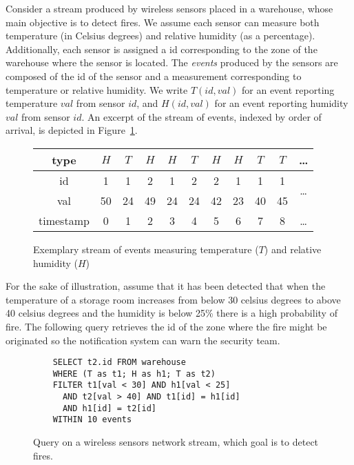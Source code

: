 \begin{example}\label{example:1}
Consider a stream produced by wireless sensors placed in a warehouse, whose main objective is to detect fires. We assume each sensor can measure both temperature (in Celsius degrees) and relative humidity (as a percentage). Additionally, each sensor is assigned a id corresponding to the zone of the warehouse where the sensor is located. The \emph{events} produced by the sensors are composed of the id of the sensor and a measurement corresponding to temperature or relative humidity. We write $T(id, val)$ for an event reporting temperature $val$ from sensor $id$, and $H(id, val)$ for an event reporting humidity $val$ from sensor $id$. An excerpt of the stream of events, indexed by order of arrival, is depicted in Figure~\ref{fig:stream}.

\begin{figure}[H]
  \centering
  \begin{tabular}{|c|c|c|c|c|c|c|c|c|c|c}\hline
    type  &$H$&$T$&$H$&$H$&$T$&$H$&$H$&$T$&$T$ & \ldots \\ \hline
    id  & 1 & 1 & 2 & 1 & 2 & 2 & 1 & 1 & 1 & \multirow{2}{*}{\ldots} \\
    val & 50 & 24& 49& 24& 24& 42& 23& 40& 45\\ \hline
    timestamp & 0 & 1 & 2 & 3 & 4 & 5 & 6 & 7 & 8 & \ldots \\ \hline
  \end{tabular}
  \caption{Exemplary stream of events measuring temperature ($T$) and relative humidity ($H$)}
  \label{fig:stream}
\end{figure}

For the sake of illustration, assume that it has been detected that when the temperature of a storage room increases from below 30 celsius degrees to above 40 celsius degrees and the humidity is below 25\% there is a high probability of fire. The following query retrieves the id of the zone where the fire might be originated so the notification system can warn the security team.

\begin{figure}[h!]
  \begin{verbatim}
    SELECT t2.id FROM warehouse
    WHERE (T as t1; H as h1; T as t2)
    FILTER t1[val < 30] AND h1[val < 25]
      AND t2[val > 40] AND t1[id] = h1[id]
      AND h1[id] = t2[id]
    WITHIN 10 events
  \end{verbatim}
  \caption{Query on a wireless sensors network stream, which goal is to detect fires.}
  \label{fig:query:1}
\end{figure}


\end{example}

